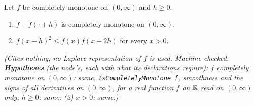 \begin{lemma}
\label{lem:cm-log-convex}
\leanok
{}
Let $f$ be completely monotone on $(0, \infty)$ and $h \ge 0$.
\begin{enumerate}
\item $f - f(\cdot + h)$ is completely monotone on $(0, \infty)$.
\item $f(x + h)^2 \le f(x)f(x + 2h)$ for every $x > 0$.
\end{enumerate}
\statusT\quad\emph{(Cites nothing; no Laplace representation of $f$ is used. Machine-checked.
\textbf{Hypotheses} (the node's, each with what its declarations require): $f$ completely monotone on
$(0, \infty)$: same, \texttt{IsCompletelyMonotone f}, smoothness and the signs of all derivatives on
$(0, \infty)$, for a real function $f$ on $\mathbb{R}$ read on $(0, \infty)$ only; $h \ge 0$: same; (2)
$x > 0$: same.)}
\end{lemma}

